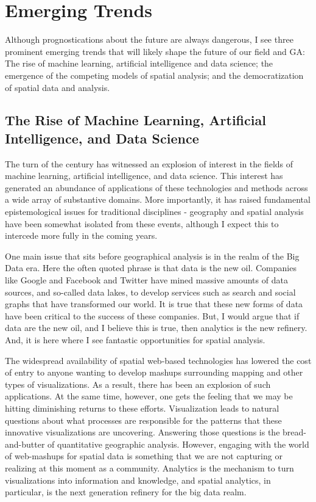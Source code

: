 \documentclass[11pt]{article}
\begin{document}
\section{Emerging Trends}
\label{sec:orga8cc385}

Although prognostications about the future are always dangerous, I see three
prominent emerging trends that will likely shape the future of our field and GA: The rise of machine learning, artificial
intelligence and data science; the emergence of the competing models of
spatial analysis; and the democratization of spatial data and analysis.



\subsection{The Rise of Machine Learning, Artificial Intelligence, and Data Science}
\label{sec:org2d89c2b}

The turn of the century has witnessed an explosion of interest in the fields of
machine learning, artificial intelligence, and data science. This interest has
generated an abundance of applications of these technologies and methods across
a wide array of substantive domains. More importantly, it has raised fundamental
epistemological issues for traditional disciplines - geography and spatial
analysis have been somewhat isolated from these events, although I expect this
to intercede more fully in the coming years.

One main issue that sits before geographical analysis is in the realm of
the Big Data era. Here the often quoted phrase is that data is the new oil.
Companies like Google and Facebook and Twitter have mined massive amounts of
data sources, and so-called data lakes, to develop services such as search and
social graphs that have transformed our world. It is true that these
new forms of data have been critical to the success of these companies. But, I
would argue that if data are the new oil, and I believe this is true, then
analytics is the new refinery. And, it is here where I see fantastic
opportunities for spatial analysis.

The widespread availability of spatial web-based technologies has lowered the
cost of entry to anyone wanting to develop mashups surrounding mapping and other
types of visualizations. As a result, there has been an explosion of such
applications. At the same time, however, one gets the feeling that we may be
hitting diminishing returns to these efforts. Visualization leads to natural
questions about what processes are responsible for the patterns that these
innovative visualizations are uncovering. Answering those questions is the
bread-and-butter of quantitative geographic analysis. However, engaging with the
world of web-mashups for spatial data is something that we are not capturing
or realizing at this moment as a community. Analytics is the mechanism to turn
visualizations into information and knowledge, and spatial analytics, in
particular, is the next generation refinery for the big data realm.
\end{document}
